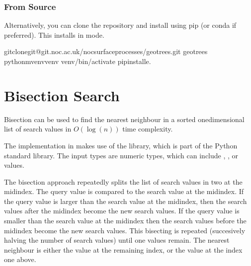 \documentclass[letterpaper,10pt,english]{sphinxmanual}
\begin{document}
\subsection{From Source}
\label{\detokenize{installation:from-source}}
\sphinxAtStartPar
Alternatively, you can clone the repository and install using pip (or conda if preferred). This installs in 
mode.

\begin{sphinxVerbatim}[commandchars=\\\{\}]
gitclonegit@git.noc.ac.uk/nocsurfaceprocesses/geotrees.git
geotrees
python\PYGZhy{}mvenvvenv
venv/bin/activate
pipinstall\PYGZhy{}e.
\end{sphinxVerbatim}

\sphinxstepscope


\chapter{Bisection Search}
\label{\detokenize{bisection:bisection-search}}\label{\detokenize{bisection::doc}}
\sphinxAtStartPar
Bisection can be used to find the nearest neighbour in a sorted one\sphinxhyphen{}dimensional list of search values in
\(O(\log(n))\) time complexity.

\sphinxAtStartPar
The implementation in  makes use of the  library, which is part of the Python standard library.
The input types are numeric types, which can include , , or  values.

\sphinxAtStartPar
The bisection approach repeatedly splits the list of search values in two at the mid\sphinxhyphen{}index. The query value is compared
to the search value at the mid\sphinxhyphen{}index. If the query value is larger than the search value at the mid\sphinxhyphen{}index, then the
search values after the mid\sphinxhyphen{}index become the new search values. If the query value is smaller than the search value at
the mid\sphinxhyphen{}index then the search values before the mid\sphinxhyphen{}index become the new search values. This bisecting is repeated
(succesively halving the number of search values) until one values remain. The nearest neighbour is either the value at
the remaining index, or the value at the index one above.
\end{document}
